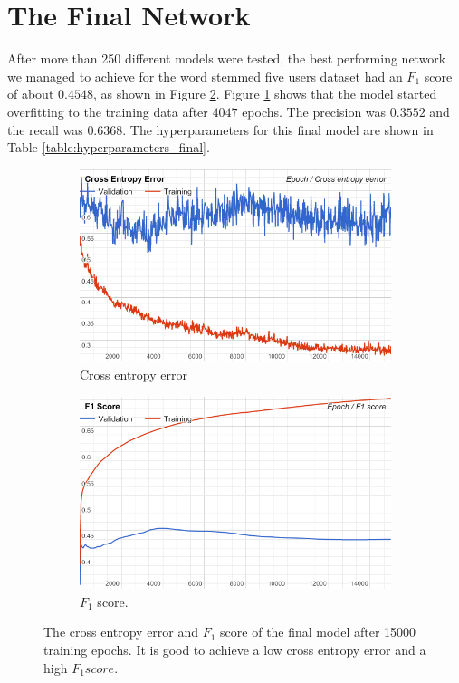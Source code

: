 \section{The Final Network}\label{sec:final_model}
After more than 250 different models were tested, the best performing network we managed to achieve for the word stemmed five users dataset had an $F_1$ score of about $0.4548$, as shown in Figure \ref{fig:final_f1}. Figure \ref{fig:final_overfitting} shows that the model started overfitting to the training data after $4047$ epochs. The precision was $0.3552$ and the recall was $0.6368$. The hyperparameters for this final model are shown in Table \ref{table:hyperparameters_final}.
\begin{figure}[h!]
\begin{subfigure}{0.5\textwidth}
\includegraphics[width=1 \linewidth]{figure/results/stemmed_cross}
\caption{Cross entropy error}
\label{fig:final_overfitting}
\end{subfigure}
\begin{subfigure}{0.5\textwidth}
\includegraphics[width=1\linewidth]{figure/results/stemmed_f1}
\caption{$F_1$ score.}
\label{fig:final_f1}
\end{subfigure}
 
\caption{The cross entropy error and $F_1$ score of the final model after 15000 training epochs. It is good to achieve a low cross entropy error and a high $F_1 score$.}
\label{fig:final_stemmed}
\end{figure}
